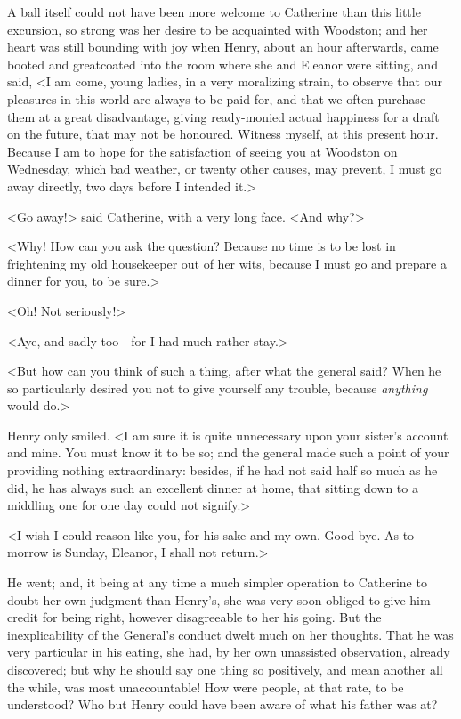  A ball itself could not have been more welcome to Catherine than this little excursion, so strong was her desire to be acquainted with Woodston; and her heart was still bounding with joy when Henry, about an hour afterwards, came booted and greatcoated into the room where she and Eleanor were sitting, and said, <I am come, young ladies, in a very moralizing strain, to observe that our pleasures in this world are always to be paid for, and that we often purchase them at a great disadvantage, giving ready-monied actual happiness for a draft on the future, that may not be honoured. Witness myself, at this present hour. Because I am to hope for the satisfaction of seeing you at Woodston on Wednesday, which bad weather, or twenty other causes, may prevent, I must go away directly, two days before I intended it.> 

 <Go away!> said Catherine, with a very long face. <And why?> 

 <Why! How can you ask the question? Because no time is to be lost in frightening my old housekeeper out of her wits, because I must go and prepare a dinner for you, to be sure.> 

 <Oh! Not seriously!> 

 <Aye, and sadly too—for I had much rather stay.> 

 <But how can you think of such a thing, after what the general said? When he so particularly desired you not to give yourself any trouble, because \textit{anything} would do.> 

 Henry only smiled. <I am sure it is quite unnecessary upon your sister's account and mine. You must know it to be so; and the general made such a point of your providing nothing extraordinary: besides, if he had not said half so much as he did, he has always such an excellent dinner at home, that sitting down to a middling one for one day could not signify.> 

 <I wish I could reason like you, for his sake and my own. Good-bye. As to-morrow is Sunday, Eleanor, I shall not return.> 

 He went; and, it being at any time a much simpler operation to Catherine to doubt her own judgment than Henry's, she was very soon obliged to give him credit for being right, however disagreeable to her his going. But the inexplicability of the General's conduct dwelt much on her thoughts. That he was very particular in his eating, she had, by her own unassisted observation, already discovered; but why he should say one thing so positively, and mean another all the while, was most unaccountable! How were people, at that rate, to be understood? Who but Henry could have been aware of what his father was at? 

